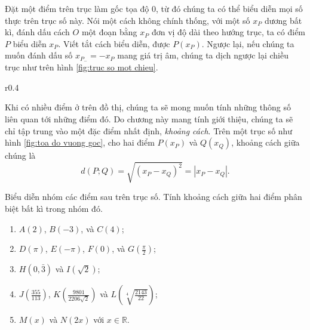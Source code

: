 \documentclass[a4paper, titlepage, openany]{book}
\newcounter{exercise}
\begin{document}
Đặt một điểm trên trục làm gốc tọa độ $0$, từ đó chúng ta có thể biểu diễn mọi số thực trên trục số này. Nói một cách không chính thống, với một số $x_P$ dương bất kì, đánh dấu cách $O$ một đoạn bằng $x_P$ đơn vị độ dài theo hướng trục, ta có điểm $P$ biểu diễn $x_P$. Viết tắt cách biểu diễn, được $P(x_P)$. Ngược lại, nếu chúng ta muốn đánh dấu số $x_{P_-}=-x_P$ mang giá trị âm, chúng ta dịch ngược lại chiều trục như trên hình \ref{fig:truc so mot chieu}.

\begin{wrapfigure}{r}{0.4\textwidth}
   \centering
   \caption{Khoảng cách trên trục số}
   \label{fig:truc so mot chieu}
\end{wrapfigure}

Khi có nhiều điểm ở trên đồ thị, chúng ta sẽ mong muốn tính những thông số liên quan tới những điểm đó. Do chương này mang tính giới thiệu, chúng ta sẽ chỉ tập trung vào một đặc điểm nhất định, \emph{khoảng cách}. Trên một trục số như hình \ref{fig:toa do vuong goc}, cho hai điểm $P(x_P)$ và $Q(x_Q)$, khoảng cách giữa chúng là $$d(P;Q)=\sqrt{(x_P-x_Q)^2}=|x_P-x_Q|.$$

\exercise[ex:0.1] Biểu diễn nhóm các điểm sau trên trục số. Tính khoảng cách giữa hai điểm phân biệt bất kì trong nhóm đó.
\begin{enumerate}
   \item $A(2)$, $B(-3)$, và $C(4)$;
   \item $D(\pi)$, $E(-\pi)$, $F(0)$, và $G\left(\frac{\pi}{2}\right)$;
   \item $H(0{,}\bar{3})$ và $I(\sqrt{2})$;
   \item $J\left(\frac{355}{113}\right)$, $K\left(\frac{9801}{2206\sqrt{2}}\right)$ và $L\left(\sqrt[4]{\frac{2143}{22}}\right)$;
   \item $M(x)$ và $N(2x)$ với $x\in\mathbb{R}$.
\end{enumerate}
\end{document}
